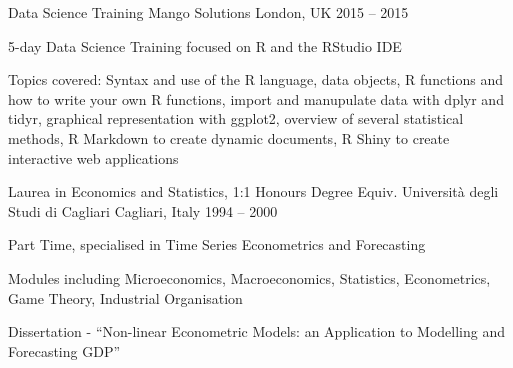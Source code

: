 \begin{cventries}
  \cventry
    {Data Science Training} %
    {Mango Solutions} %
    {London, UK} %
    {2015 – 2015} %
    {
      \begin{cvitems} %
        \item {5-day Data Science Training focused on R and the RStudio IDE}
        \item {Topics covered: Syntax and use of the R language, data objects, R functions and how to write your own R functions, import and manupulate data with dplyr and tidyr, graphical representation with ggplot2, overview of several statistical methods, R Markdown to create dynamic documents, R Shiny to create interactive web applications}
      \end{cvitems}
    }

  \cventry
    {Laurea in Economics and Statistics, 1:1 Honours Degree Equiv.} %
    {Università degli Studi di Cagliari} %
    {Cagliari, Italy} %
    {1994 – 2000} %
    {
      \begin{cvitems} %
        \item {Part Time, specialised in Time Series Econometrics and Forecasting}
        \item {Modules including Microeconomics, Macroeconomics, Statistics, Econometrics, Game Theory, Industrial Organisation}
        \item {Dissertation - “Non-linear Econometric Models: an Application to Modelling and Forecasting GDP”}
      \end{cvitems}
    }
\end{cventries}
